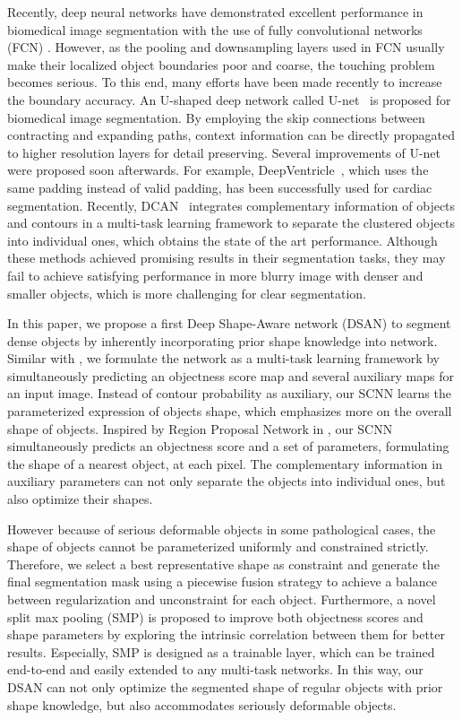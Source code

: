 Recently, deep neural networks have demonstrated excellent performance in biomedical image segmentation with the use of fully convolutional networks (FCN) \cite{Dhungel2015,Ronneberger2015,Roth2015,Chen2015,Lieman-Sifry2017,Xu2016,Chen2016b}.
However, as the pooling and downsampling layers used in FCN usually make their localized object boundaries poor and coarse, the touching problem becomes serious.
To this end, many efforts have been made recently to increase the boundary accuracy.
An U-shaped deep network called U-net~\cite{Ronneberger2015} is proposed for biomedical image segmentation.
By employing the skip connections between contracting and expanding paths, context information can be directly propagated to higher resolution layers for detail preserving.
Several improvements of U-net were proposed soon afterwards.
For example, DeepVentricle~\cite{Lieman-Sifry2017}, which uses the same padding instead of valid padding, has been successfully used for cardiac segmentation.
Recently, DCAN~\cite{Chen2016a} integrates complementary information of objects and contours in a multi-task learning framework to separate the clustered objects into individual ones, which obtains the state of the art performance.
Although these methods achieved promising results in their segmentation tasks, they may fail to achieve satisfying performance in more blurry image with denser and smaller objects, which is more challenging for clear segmentation.

In this paper, we propose a first Deep Shape-Aware network (DSAN) to segment dense objects by inherently incorporating prior shape knowledge into network.
Similar with \cite{Chen2016a,Chen2016,Bertasius2016}, we formulate the network as a multi-task learning framework by simultaneously predicting an objectness score map and several auxiliary maps for an input image.
Instead of contour probability as auxiliary, our SCNN learns the parameterized expression of objects shape, which emphasizes more on the overall shape of objects.
Inspired by Region Proposal Network in \cite{Ren2015}, our SCNN simultaneously predicts an objectness score and a set of parameters, formulating the shape of a nearest object, at each pixel.
The complementary information in auxiliary parameters can not only separate the objects into individual ones, but also optimize their shapes.

However because of serious deformable objects in some pathological cases, the shape of objects cannot be parameterized uniformly and constrained strictly.
Therefore, we select a best representative shape as constraint and generate the final segmentation mask using a piecewise fusion strategy to achieve a balance between regularization and unconstraint for each object.
Furthermore, a novel split max pooling (SMP) is proposed to improve both objectness scores and shape parameters by exploring the intrinsic correlation between them for better results.
Especially, SMP is designed as a trainable layer, which can be trained end-to-end and easily extended to any multi-task networks.
In this way, our DSAN can not only optimize the segmented shape of regular objects with prior shape knowledge, but also accommodates seriously deformable objects.

